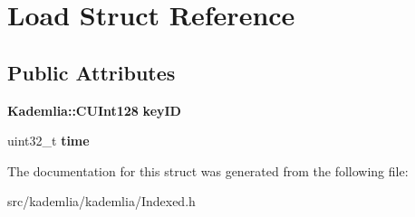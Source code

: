 \section{Load Struct Reference}
\label{structLoad}
\subsection*{Public Attributes}
\begin{DoxyCompactItemize}
\item 
{\bf Kademlia::CUInt128} {\bfseries keyID}\label{structLoad_a36585b38eac37b1ffd3faa81e125128f}

\item 
uint32\_\-t {\bfseries time}\label{structLoad_ad7933571b0b71fcde726374aae5b8806}

\end{DoxyCompactItemize}


The documentation for this struct was generated from the following file:\begin{DoxyCompactItemize}
\item 
src/kademlia/kademlia/Indexed.h\end{DoxyCompactItemize}
